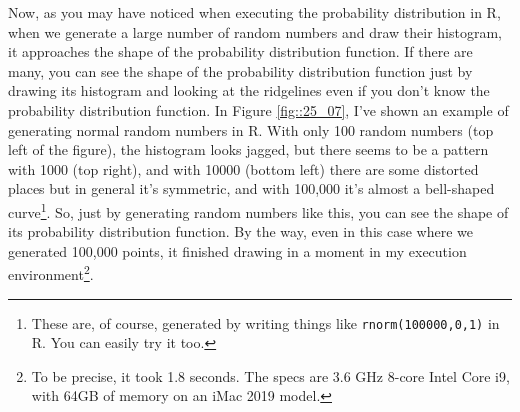 \documentclass{ltjsarticle}
\begin{document}
Now, as you may have noticed when executing the probability distribution in R, when we generate a large number of random numbers and draw their histogram, it approaches the shape of the probability distribution function. If there are many, you can see the shape of the probability distribution function just by drawing its histogram and looking at the ridgelines even if you don't know the probability distribution function. In Figure \ref{fig::25_07}, I've shown an example of generating normal random numbers in R. With only 100 random numbers (top left of the figure), the histogram looks jagged, but there seems to be a pattern with 1000 (top right), and with 10000 (bottom left) there are some distorted places but in general it's symmetric, and with 100,000 it's almost a bell-shaped curve\footnote{These are, of course, generated by writing things like \texttt{rnorm(100000,0,1)} in R. You can easily try it too.}. So, just by generating random numbers like this, you can see the shape of its probability distribution function. By the way, even in this case where we generated 100,000 points, it finished drawing in a moment in my execution environment\footnote{To be precise, it took 1.8 seconds. The specs are 3.6 GHz 8-core Intel Core i9, with 64GB of memory on an iMac 2019 model.}.



\end{document}
